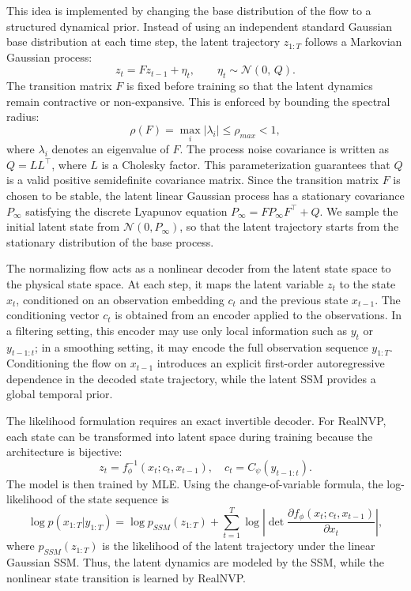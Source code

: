 This idea is implemented by changing the base distribution of the flow to a structured dynamical prior. Instead of using an independent standard Gaussian base distribution at each time step, the latent trajectory $z_{1:T}$ follows a Markovian Gaussian process:
\begin{equation}
z_t = F z_{t-1} + \eta_t, \qquad \eta_t \sim \mathcal{N}(0,\,Q).
\end{equation}
The transition matrix $F$ is fixed before training so that the latent dynamics remain contractive or non-expansive. This is enforced by bounding the spectral radius:
\begin{equation*}
    \rho(F) = \max_i |\lambda_i| \le \rho_{max} < 1,
\end{equation*}
where $\lambda_i$ denotes an eigenvalue of $F$. The process noise covariance is written as $Q=LL^\top$, where $L$ is a Cholesky factor. This parameterization guarantees that $Q$ is a valid positive semidefinite covariance matrix. Since the transition matrix $F$ is chosen to be stable, the latent linear Gaussian process has a stationary covariance $P_\infty$ satisfying the discrete Lyapunov equation $P_\infty = F P_\infty F^\top + Q$. We sample the initial latent state from $\mathcal{N}(0,P_\infty)$, so that the latent trajectory starts from the stationary distribution of the base process.

The normalizing flow acts as a nonlinear decoder from the latent state space to the physical state space. At each step, it maps the latent variable $z_t$ to the state $x_t$, conditioned on an observation embedding $c_t$ and the previous state $x_{t-1}$. The conditioning vector $c_t$ is obtained from an encoder applied to the observations. In a filtering setting, this encoder may use only local information such as $y_t$ or $y_{t-1:t}$; in a smoothing setting, it may encode the full observation sequence $y_{1:T}$. Conditioning the flow on $x_{t-1}$ introduces an explicit first-order autoregressive dependence in the decoded state trajectory, while the latent \ac{SSM} provides a global temporal prior.

The likelihood formulation requires an exact invertible decoder. For RealNVP, each state can be transformed into latent space during training because the architecture is bijective:
\begin{equation}
    z_t = f_\phi^{-1}(x_t; c_t, x_{t-1}),\quad c_t=C_\psi(y_{t-1:t}).
\end{equation}
The model is then trained by \ac{MLE}. Using the change-of-variable formula, the log-likelihood of the state sequence is
\begin{equation}
    \log p(x_{1:T} | y_{1:T}) = \log p_{SSM}(z_{1:T}) + \sum_{t=1}^T \log \left| \det \frac{\partial f_\phi(x_t; c_t, x_{t-1})}{\partial x_t} \right|,
\end{equation}
where $p_{SSM}(z_{1:T})$ is the likelihood of the latent trajectory under the linear Gaussian \ac{SSM}. Thus, the latent dynamics are modeled by the \ac{SSM}, while the nonlinear state transition is learned by RealNVP.

